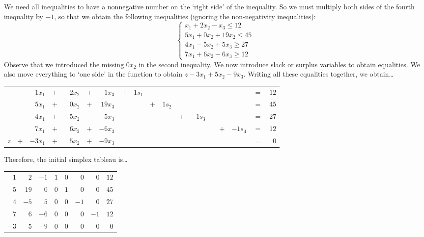 \documentclass[12pt,letterpaper]{exam}
\begin{document}
\begin{questions}
\sol We need all inequalities to have a nonnegative number on the `right side' of the inequality. So we must multiply both sides of the fourth inequality by $-1$, so that we obtain the following inequalities (ignoring the non-negativity inequalities): 
	\[
	\begin{cases}
	x_1 + 2x_2 - x_3 \leq 12 \\
	5x_1 + 0x_2 + 19x_2 \leq 45 \\
	4x_1 - 5x_2 + 5x_3 \geq 27 \\
	7x_1 + 6x_2 - 6x_3 \geq 12 
	\end{cases}
	\]
Observe that we introduced the missing $0x_2$ in the second inequality. We now introduce slack or surplus variables to obtain equalities. We also move everything to `one side' in the function to obtain $z - 3x_1 + 5x_2 - 9x_3$. Writing all these equalities together, we obtain\dots \par
	\begin{table}[H]
	\centering
	\begin{tabular}{rrrrrrrrrrrrrrrrrr}
		       & & $1x_1$ & $+$ & $2x_2$ & $+$ & $-1x_3$ & $+$ & $1s_1$ & & & & & & & & $=$ & $12$ \\
		       & & $5x_1$ & $+$ & $0x_2$ & $+$ & $19x_3$ & &  & $+$ & $1s_2$ & & & & & & $=$ & $45$ \\
		       & & $4x_1$ & $+$ & $-5x_2$ & & $5x_3$ & & & & & $+$ & $-1s_3$ & & & & $=$ & $27$ \\
		       & & $7x_1$ & $+$ & $6x_2$ & $+$ & $-6x_3$ & & & & & & & & $+$ & $-1s_4$ & $=$ & $12$ \\
	$z$ & $+$ & $-3x_1$ & $+$ & $5x_2$ & $+$ & $-9x_3$ & & & & & & & & & & $=$ & $0$ \\
	\end{tabular}
	\end{table} \par
Therefore, the initial simplex tableau is\dots \par
	\begin{table}[H]
	\centering
	\begin{tabular}{rrrrrrr|r}
	$1$ & $2$ & $-1$ & $1$ & $0$ & $0$ & $0$ & $12$ \\
	$5$ & $19$ & $0$ & $0$ & $1$ & $0$ & $0$ & $45$ \\
	$4$ & $-5$ & $5$ & $0$ & $0$ & $-1$ & $0$ & $27$ \\
	$7$ & $6$ & $-6$ & $0$ & $0$ & $0$ & $-1$ & $12$ \\ \hline
	$-3$ & $5$ & $-9$ & $0$ & $0$ & $0$ & $0$ & $0$ \\
	\end{tabular}
	\end{table}




\end{questions}
\end{document}
